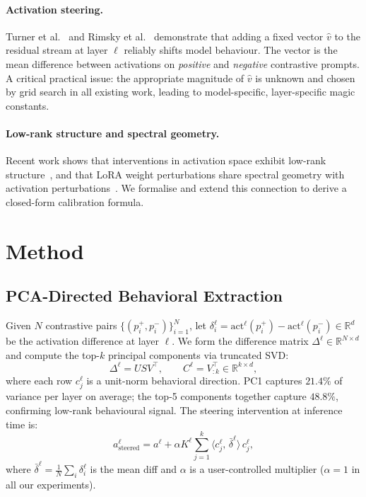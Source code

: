 \documentclass{article}
\begin{document}
\paragraph{Activation steering.}
Turner et al.~\cite{turner2023activation} and Rimsky et al.~\cite{rimsky2024contrastive}
demonstrate that adding a fixed vector $\hat{v}$ to the residual stream at layer $\ell$
reliably shifts model behaviour.
The vector is the mean difference between activations on \emph{positive} and
\emph{negative} contrastive prompts.
A critical practical issue: the appropriate magnitude of $\hat{v}$ is unknown and chosen
by grid search in all existing work, leading to model-specific, layer-specific magic
constants.

\paragraph{Low-rank structure and spectral geometry.}
Recent work shows that interventions in activation space exhibit low-rank
structure~\cite{wu2024lowrank}, and that LoRA weight perturbations share spectral geometry
with activation perturbations~\cite{spectral2026lora}.
We formalise and extend this connection to derive a closed-form calibration formula.

\section{Method}
\label{sec:method}

\subsection{PCA-Directed Behavioral Extraction}
\label{sec:pca}

Given $N$ contrastive pairs $\{(p_i^+, p_i^-)\}_{i=1}^N$, let
$\delta_i^\ell = \mathrm{act}^\ell(p_i^+) - \mathrm{act}^\ell(p_i^-) \in \mathbb{R}^d$
be the activation difference at layer $\ell$.
We form the difference matrix $\Delta^\ell \in \mathbb{R}^{N \times d}$ and compute the
top-$k$ principal components via truncated SVD:
\begin{equation}
  \Delta^\ell = U S V^\top, \qquad
  C^\ell = V_{:k}^\top \in \mathbb{R}^{k \times d},
  \label{eq:pca}
\end{equation}
where each row $c_j^\ell$ is a unit-norm behavioral direction.
PC1 captures $21.4\%$ of variance per layer on average; the top-5 components
together capture $48.8\%$, confirming low-rank behavioural signal.
The steering intervention at inference time is:
\begin{equation}
  a^\ell_\mathrm{steered} = a^\ell + \alpha K^\ell \sum_{j=1}^k
    \bigl\langle c_j^\ell,\, \bar{\delta}^\ell \bigr\rangle\, c_j^\ell,
  \label{eq:steer}
\end{equation}
where $\bar{\delta}^\ell = \frac{1}{N}\sum_i \delta_i^\ell$ is the mean diff and
$\alpha$ is a user-controlled multiplier ($\alpha=1$ in all our experiments).
\end{document}
